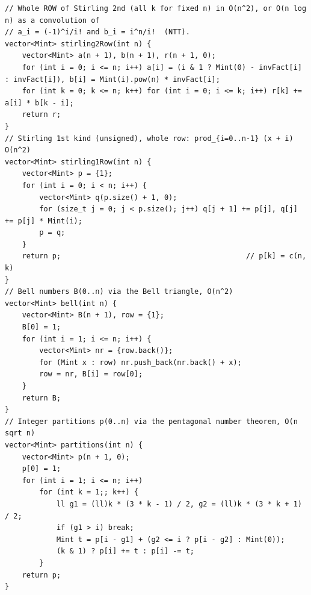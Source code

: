 \documentclass[9pt,a4paper,twocolumn]{extarticle}
\begin{document}
\begin{lstlisting}
// Whole ROW of Stirling 2nd (all k for fixed n) in O(n^2), or O(n log n) as a convolution of
// a_i = (-1)^i/i! and b_i = i^n/i!  (NTT).
vector<Mint> stirling2Row(int n) {
    vector<Mint> a(n + 1), b(n + 1), r(n + 1, 0);
    for (int i = 0; i <= n; i++) a[i] = (i & 1 ? Mint(0) - invFact[i] : invFact[i]), b[i] = Mint(i).pow(n) * invFact[i];
    for (int k = 0; k <= n; k++) for (int i = 0; i <= k; i++) r[k] += a[i] * b[k - i];
    return r;
}
// Stirling 1st kind (unsigned), whole row: prod_{i=0..n-1} (x + i)   O(n^2)
vector<Mint> stirling1Row(int n) {
    vector<Mint> p = {1};
    for (int i = 0; i < n; i++) {
        vector<Mint> q(p.size() + 1, 0);
        for (size_t j = 0; j < p.size(); j++) q[j + 1] += p[j], q[j] += p[j] * Mint(i);
        p = q;
    }
    return p;                                           // p[k] = c(n, k)
}
// Bell numbers B(0..n) via the Bell triangle, O(n^2)
vector<Mint> bell(int n) {
    vector<Mint> B(n + 1), row = {1};
    B[0] = 1;
    for (int i = 1; i <= n; i++) {
        vector<Mint> nr = {row.back()};
        for (Mint x : row) nr.push_back(nr.back() + x);
        row = nr, B[i] = row[0];
    }
    return B;
}
// Integer partitions p(0..n) via the pentagonal number theorem, O(n sqrt n)
vector<Mint> partitions(int n) {
    vector<Mint> p(n + 1, 0);
    p[0] = 1;
    for (int i = 1; i <= n; i++)
        for (int k = 1;; k++) {
            ll g1 = (ll)k * (3 * k - 1) / 2, g2 = (ll)k * (3 * k + 1) / 2;
            if (g1 > i) break;
            Mint t = p[i - g1] + (g2 <= i ? p[i - g2] : Mint(0));
            (k & 1) ? p[i] += t : p[i] -= t;
        }
    return p;
}
\end{lstlisting}

\filbreak
\end{document}
